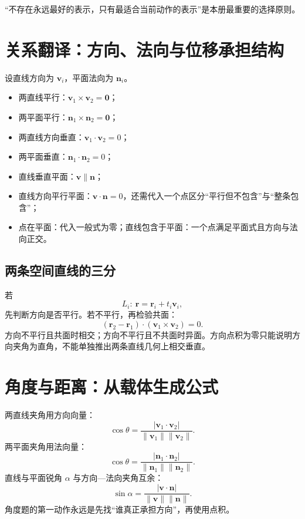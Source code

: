 \documentclass[11pt,a4paper]{ctexart}
\begin{document}
“不存在永远最好的表示，只有最适合当前动作的表示”是本册最重要的选择原则。

\section{关系翻译：方向、法向与位移承担结构}

设直线方向为 $\mathbf v_i$，平面法向为 $\mathbf n_i$。

\begin{itemize}
  \item 两直线平行：$\mathbf v_1\times\mathbf v_2=\mathbf0$；
  \item 两平面平行：$\mathbf n_1\times\mathbf n_2=\mathbf0$；
  \item 两直线方向垂直：$\mathbf v_1\cdot\mathbf v_2=0$；
  \item 两平面垂直：$\mathbf n_1\cdot\mathbf n_2=0$；
  \item 直线垂直平面：$\mathbf v\parallel\mathbf n$；
  \item 直线方向平行平面：$\mathbf v\cdot\mathbf n=0$，还需代入一个点区分“平行但不包含”与“整条包含”；
  \item 点在平面：代入一般式为零；直线包含于平面：一个点满足平面式且方向与法向正交。
\end{itemize}

\subsection{两条空间直线的三分}

若
\[
L_i:\ \mathbf r=\mathbf r_i+t_i\mathbf v_i,
\]
先判断方向是否平行。若不平行，再检验共面：
\[
\boxed{(\mathbf r_2-\mathbf r_1)\cdot(\mathbf v_1\times\mathbf v_2)=0}.
\]
方向不平行且共面时相交；方向不平行且不共面时异面。方向点积为零只能说明方向夹角为直角，不能单独推出两条直线几何上相交垂直。

\section{角度与距离：从载体生成公式}

两直线夹角用方向向量：
\[
\cos\theta=\frac{\lvert\mathbf v_1\cdot\mathbf v_2\rvert}{\lVert\mathbf v_1\rVert\lVert\mathbf v_2\rVert}.
\]
两平面夹角用法向量：
\[
\cos\theta=\frac{\lvert\mathbf n_1\cdot\mathbf n_2\rvert}{\lVert\mathbf n_1\rVert\lVert\mathbf n_2\rVert}.
\]
直线与平面锐角 $\alpha$ 与方向—法向夹角互余：
\[
\sin\alpha=\frac{\lvert\mathbf v\cdot\mathbf n\rvert}{\lVert\mathbf v\rVert\lVert\mathbf n\rVert}.
\]
角度题的第一动作永远是先找“谁真正承担方向”，再使用点积。
\end{document}
